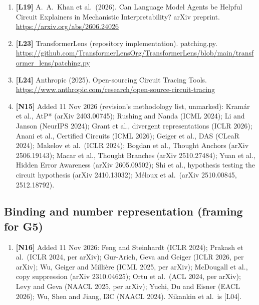 \documentclass[10pt,a4paper]{article}
\begin{document}
{\begin{enumerate}[label={},leftmargin=0pt]
Interpretable LLM Units. ICML / PMLR 306:15966--15998. \url{https://proceedings.mlr.press/v306/chen26cv.html}
\item \textbf{[L19]} A.~A.~Khan et al.\ (2026). Can Language Model Agents be Helpful Circuit Explainers in
Mechanistic Interpretability? arXiv preprint. \url{https://arxiv.org/abs/2606.24026}
\item \textbf{[L23]} TransformerLens (repository implementation). patching.py.
\url{https://github.com/TransformerLensOrg/TransformerLens/blob/main/transformer_lens/patching.py}
\item \textbf{[L24]} Anthropic (2025). Open-sourcing Circuit Tracing Tools.
\url{https://www.anthropic.com/research/open-source-circuit-tracing}
\item \textbf{[N15]} Added 11 Nov 2026 (revision's methodology list, unmarked): Kram\'ar et al., AtP* (arXiv
2403.00745); Rushing and Nanda (ICML 2024); Li and Janson (NeurIPS 2024); Grant et al., divergent representations
(ICLR 2026); Anani et al., Certified Circuits (ICML 2026); Geiger et al., DAS (CLeaR 2024); Makelov et al.\ (ICLR
2024); Bogdan et al., Thought Anchors (arXiv 2506.19143); Macar et al., Thought Branches (arXiv 2510.27484);
Yuan et al., Hidden Error Awareness (arXiv 2605.09502); Shi et al., hypothesis testing the circuit hypothesis
(arXiv 2410.13032); M\'eloux et al.\ (arXiv 2510.00845, 2512.18792).
\end{enumerate}

\subsection*{Binding and number representation (framing for G5)}
\begin{enumerate}[label={},leftmargin=0pt]
\item \textbf{[N16]} Added 11 Nov 2026: Feng and Steinhardt (ICLR 2024); Prakash et al.\ (ICLR 2024, per arXiv);
Gur-Arieh, Geva and Geiger (ICLR 2026, per arXiv); Wu, Geiger and Milli\`ere (ICML 2025, per arXiv); McDougall et
al., copy suppression (arXiv 2310.04625); Ortu et al.\ (ACL 2024, per arXiv); Levy and Geva (NAACL 2025, per
arXiv); Yuchi, Du and Eisner (EACL 2026); Wu, Shen and Jiang, I3C (NAACL 2024). Nikankin et al.\ is [L04].
\end{enumerate}

}
\end{document}
